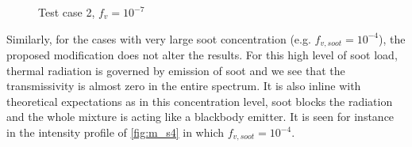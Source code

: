 \documentclass[3p]{elsarticle}
\begin{document}
\begin{figure}[p]
	\centering{}
	\par\medskip		
	\centering{}
	\caption{Test case 2, \({f_v=10^{-7}}\)} \label{fig:m_s7}
\end{figure}

\pagebreak

Similarly, for the cases with very large soot concentration (e.g. \(f_{v,soot}=10^{-4}\)), the proposed modification does not alter the results. For this high level of soot load, thermal radiation is governed by emission of soot and we see that the transmissivity is almost zero in the entire spectrum. It is also inline with theoretical expectations as in this concentration level, soot blocks the radiation and the whole mixture is acting like a blackbody emitter. It is seen for instance in the intensity profile of \cref{fig:m_s4} in which \(f_{v,soot}=10^{-4}\).
\end{document}
